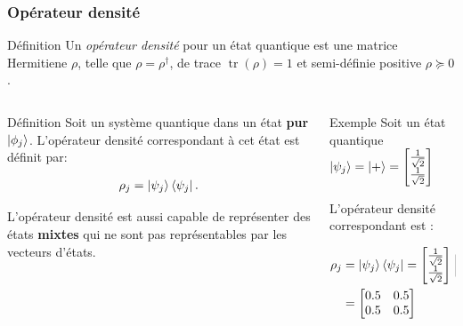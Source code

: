 \documentclass{beamer}
\DeclareMathOperator{\tr}{tr}
\begin{document}
\begin{frame}
    \frametitle{Opérateur densité}
    \small

    \begin{block}{Définition}
        Un \textit{opérateur densité} pour un état quantique est une matrice Hermitiene $\rho$, telle que $\rho = \rho^{\dagger}$, de trace $\tr(\rho) = 1$ et semi-définie positive $\rho \succeq 0$.
    \end{block}

    \begin{columns}
        \begin{column}{0.5\textwidth}
            \begin{block}{Définition}
                Soit un système quantique dans un état \textbf{pur} $\ket{\phi_j}$.  L'opérateur densité correspondant à cet état est définit par:
        
                \begin{align}
                    \rho_j = \ket{\psi_j} \bra{\psi_j}.
                \end{align}
        
                L'opérateur densité est aussi capable de représenter des états \textbf{mixtes} qui ne sont pas représentables par les vecteurs d'états.
            \end{block}
        \end{column}
        \begin{column}{0.5\textwidth}
            \begin{block}{Exemple}
                Soit un état quantique $\ket{\psi_j} = \ket{+} = 
                \begin{bmatrix}
                    \frac{1}{\sqrt{2}} \\ \frac{1}{\sqrt{2}}
                \end{bmatrix}$
        
                L'opérateur densité correspondant est : 

                \begin{align}
                    \rho_j &= \ket{\psi_j}\bra{\psi_j} =\begin{bmatrix} \frac{1}{\sqrt{2}} \\ \frac{1}{\sqrt{2}} \end{bmatrix} \begin{bmatrix} \frac{1}{\sqrt{2}} & \frac{1}{\sqrt{2}} \end{bmatrix} \nonumber\\
                    &= \begin{bmatrix} 0.5 & 0.5 \\ 0.5 & 0.5 \end{bmatrix} \nonumber
                \end{align}
            \end{block}
        \end{column}
    \end{columns}
\end{frame}
\end{document}
